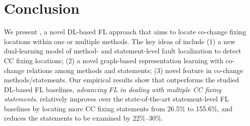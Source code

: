 \section{Conclusion}

We present {\tool}, a novel DL-based FL approach that aims to locate
co-change fixing locations within one or multiple methods. The key
ideas of {\tool} include (1) a new dual-learning model of method- and
statement-level fault localization to detect CC fixing locations; (2)
a novel graph-based representation learning with co-change relations
among methods and statements; (3) novel feature in co-change
methods/statements. Our empirical results show that {\tool}
outperforms the studied DL-based FL baselines, {\em advancing FL in
  dealing with multiple CC fixing statements}.
%
{\tool} relatively improves over the state-of-the-art statement-level
FL baselines by locating more CC fixing statements from 26.5\% to
155.6\%, and reduces the statements to be examined by 22\%--30\%.


